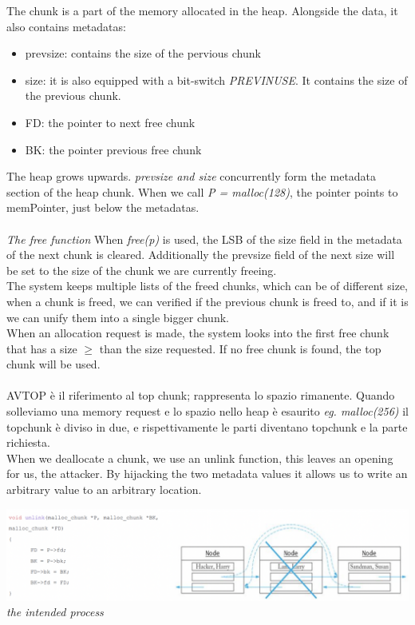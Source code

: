 \documentclass[11pt, oneside]{article}   	%
\begin{document}
The chunk is a part of the memory allocated in the heap. Alongside the data, it also contains metadatas:
\begin{itemize}
\item prev\textunderscore size: contains the size of the pervious chunk 
\item size: it is also equipped with a bit-switch \emph{PREV\textunderscore INUSE}.
It contains the size of the previous chunk.
\item FD: the pointer to next free chunk
\item BK: the pointer previous free chunk
\end{itemize}

The heap grows upwards.
\emph{prev\textunderscore size and size} concurrently form the metadata section of the heap chunk.
When we call \emph{P = malloc(128)}, the pointer points to memPointer, just below the metadatas.\\\\
\emph{The free function}
When \emph{free(p)} is used, the LSB of the size field in the metadata of the next chunk is cleared. Additionally the prev\textunderscore size field of the next size will be set to the size of the chunk we are currently freeing. \\
The system keeps multiple lists of the freed chunks, which can be of different size, when a chunk is freed, we can verified if the previous chunk is freed to, and if it is we can unify them into a single bigger chunk.\\
When an allocation request is made, the system looks into the first free chunk that has a size \(\geq\) than the size requested. If no free chunk is found, the top chunk will be used.\\\\
AV\textunderscore TOP è il riferimento al top chunk; rappresenta lo spazio rimanente. Quando solleviamo una memory request e lo spazio nello heap è esaurito \emph{eg. malloc(256)} il topchunk è diviso in due, e rispettivamente le parti diventano topchunk e la parte richiesta.\\
When we deallocate a chunk, we use an unlink function, this leaves an opening for us, the attacker. By hijacking the two metadata values it allows us to write an arbitrary value to an arbitrary location.
\begin{center}
\includegraphics[scale = 0.6]{atk1}
\emph{the intended process}
\end{center}
\end{document}
